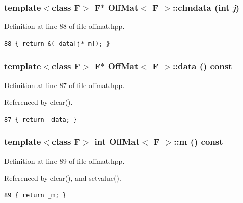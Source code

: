 \subsubsection{\setlength{\rightskip}{0pt plus 5cm}template$<$class F$>$ F$\ast$ {\bf Off\-Mat}$<$ F $>$::clmdata (int {\em j})\hspace{0.3cm}{\tt  [inline]}}\label{classOffMat_29a94d113c6ed3f2191bb35c48a46e16_29a94d113c6ed3f2191bb35c48a46e16}




Definition at line 88 of file offmat.hpp.

\footnotesize\begin{verbatim}88 { return &(_data[j*_m]); }
\end{verbatim}\normalsize 


\subsubsection{\setlength{\rightskip}{0pt plus 5cm}template$<$class F$>$ F$\ast$ {\bf Off\-Mat}$<$ F $>$::data () const\hspace{0.3cm}{\tt  [inline]}}\label{classOffMat_ad3b2b9598c8547b4f7afe7a79ed520c_ad3b2b9598c8547b4f7afe7a79ed520c}




Definition at line 87 of file offmat.hpp.

Referenced by clear().

\footnotesize\begin{verbatim}87 { return _data; }
\end{verbatim}\normalsize 


\subsubsection{\setlength{\rightskip}{0pt plus 5cm}template$<$class F$>$ int {\bf Off\-Mat}$<$ F $>$::m () const\hspace{0.3cm}{\tt  [inline]}}\label{classOffMat_6a2fa69c25bf8ed36e019d0fb3f5e966_6a2fa69c25bf8ed36e019d0fb3f5e966}




Definition at line 89 of file offmat.hpp.

Referenced by clear(), and setvalue().

\footnotesize\begin{verbatim}89 { return _m; }
\end{verbatim}\normalsize 


